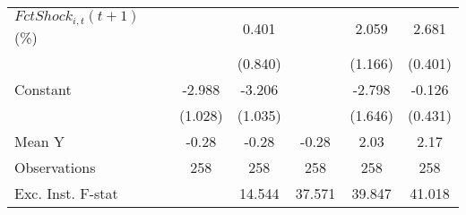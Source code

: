 {\begin{tabular}{l*{5}{c}}
\addlinespace
$ FctShock_{i,t}(t+1)$ (\%)&                     &       0.401         &                     &       2.059         &       2.681\sym{***}\\
                    &                     &     (0.840)         &                     &     (1.166)         &     (0.401)         \\
\addlinespace
Constant            &      -2.988\sym{**} &      -3.206\sym{***}&                     &      -2.798         &      -0.126         \\
                    &     (1.028)         &     (1.035)         &                     &     (1.646)         &     (0.431)         \\
\midrule
Mean Y              &       -0.28         &       -0.28         &       -0.28         &        2.03         &        2.17         \\
Observations        &         258         &         258         &         258         &         258         &         258         \\
Exc. Inst. F-stat   &                     &      14.544         &      37.571         &      39.847         &      41.018         \\
\bottomrule
\end{tabular}
}
